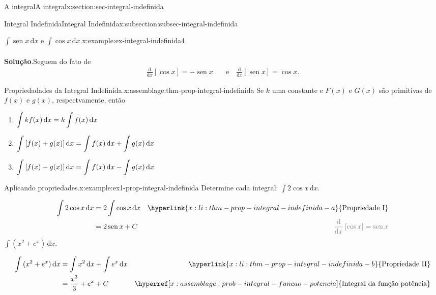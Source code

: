 \documentclass[oneside,10pt,]{article}
\newcommand{\blocktitlefont}{\relax}
\numberwithin{equation}{section}
\newcommand{\dd}{\mathrm{d}}
\newcommand{\integral}[2]{\displaystyle\int {#1}\,\dd {#2}}
\DeclareMathOperator{\sin}{sen}
\newcommand{\amp}{&}
\begin{document}
\begin{sectionptx}{A integral}{}{A integral}{}{}{x:section:sec-integral-indefinida}
\begin{subsectionptx}{Integral Indefinida}{}{Integral Indefinida}{}{}{x:subsection:subsec-integral-indefinida}
\begin{example}{\(\integral{\sin{x}}{x}\) e \(\integral{\cos{x}}{x}\).}{x:example:ex-integral-indefinida4}
\begin{align*}
\end{align*}
%
\par\smallskip%
\noindent\textbf{\blocktitlefont Solução}.\hypertarget{g:solution:idp23}{}\quad{}Seguem do fato de%
\begin{align*}
\frac{\dd }{\dd x}[\cos{x}]=-\sin{x} \amp \quad  \text{e} \quad \frac{\dd }{\dd x}[\sin{x}]=\cos{x}\text{.}
\end{align*}
%
\end{example}
\begin{assemblage}{Propriedadades da Integral Indefinida.}{x:assemblage:thm-prop-integral-indefinida}%
Se  \(k\) uma constante e \(F(x)\) e \(G(x)\) são primitivas de \(f(x)\) e \(g(x)\), respectvamente, então%
\begin{enumerate}[label=\Roman*)]
\item\hypertarget{x:li:thm-prop-integral-indefinida-a}{}\(\displaystyle \small{\integral{kf(x)}{x}=k\integral{f(x)}{x}}\)%
\item\hypertarget{x:li:thm-prop-integral-indefinida-b}{}\(\displaystyle \small{\integral{\left[ f(x) + g(x)\right]}{x}=\integral{f(x)}{x} + \integral{g(x)}{x}}\)%
\item\hypertarget{x:li:thm-prop-integral-indefinida-c}{}\(\displaystyle \small{\integral{\left[f(x) - g(x)\right]}{x}=\integral{f(x)}{x} - \integral{g(x)}{x}}\)%
\end{enumerate}
%
\end{assemblage}
\begin{example}{Aplicando propriedades.}{x:example:ex1-prop-integral-indefinida}%
Determine cada integral: \(\integral{2\cos{x}}{x}\).%
\par\smallskip%
\noindent%
\begin{align*}
\integral{2\cos{x}}{x} \amp = 2\integral{\cos{x}}{x} \amp \hyperlink{x:li:thm-prop-integral-indefinida-a}{\text{Propriedade I}}\\
\amp = 2\sin{x} + C\amp \color{gray}{\frac{\dd}{\dd x}\left[\cos{x}\right]=\sin{x}} 
\end{align*}
%
 \(\integral{(x^2+ e^x)}{x}\).%
\par\smallskip%
\noindent%
\begin{align*}
\integral{(x^2+ e^x)}{x}\amp = \integral{x^2}{x} + \integral{e^x}{x} \amp \hyperlink{x:li:thm-prop-integral-indefinida-b}{\text{Propriedade II}}\\
\amp = \frac{x^3}{3} + e^x + C \amp \hyperref[x:assemblage:prob-integral-funcao-potencia]{\text{Integral da função potência}}
\end{align*}

\end{example}
\end{subsectionptx}
\end{sectionptx}
\end{document}
